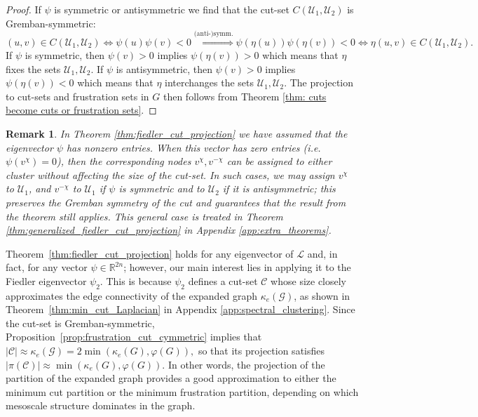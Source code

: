 \documentclass[reprint,onecolumn]{article}
\newtheorem{remark}[theorem]{Remark}
\newcommand{\mc}[1]{\mathcal{#1}}
\newcommand{\R}{\mathbb{R}}
\newcommand{\1}{\mathbb{1}}
\newcommand{\0}{\mathbf{0}}
\begin{document}
\begin{proof}
If $\psi$ is symmetric or antisymmetric we find that the cut-set $C(\mathcal{U}_1,\mathcal{U}_2)$ is Gremban-symmetric:
$$
(u,v)\in C(\mathcal{U}_1,\mathcal{U}_2) \iff \psi(u)\psi(v)<0 \overset{\text{(anti-)symm.}}{\iff} \psi(\eta(u))\psi(\eta(v))<0 \iff \eta(u,v)\in C(\mathcal{U}_1,\mathcal{U}_2).
$$
If $\psi$ is symmetric, then $\psi(v)>0$ implies $\psi(\eta(v))>0$ which means that $\eta$ fixes the sets $\mathcal{U}_1,\mathcal{U}_2$. If $\psi$ is antisymmetric, then $\psi(v)>0$ implies $\psi(\eta(v))<0$ which means that $\eta$ interchanges the sets $\mathcal{U}_1,\mathcal{U}_2$. The projection to cut-sets and frustration sets in $G$ then follows from Theorem \ref{thm: cuts become cuts or frustration sets}.
\end{proof}

\begin{remark}  \label{rem:psi_neq_0_case}
In Theorem \ref{thm:fiedler_cut_projection} we have assumed that the eigenvector $\psi$ has nonzero entries. 
When this vector has zero entries (i.e. $\psi(v^{\chi})=0$), then the corresponding nodes $v^\chi,v^{-\chi}$ can be assigned to either cluster without affecting the size of the cut-set. In such cases, we may assign \( v^\chi \) to $\mathcal{U}_1$, and $v^{-\chi}$ to $\mathcal{U}_1$ if $\psi$ is symmetric and to $\mathcal{U}_2$ if it is antisymmetric; this preserves the Gremban symmetry of the cut and guarantees that the result from the theorem still applies. This general case is treated in Theorem \ref{thm:generalized_fiedler_cut_projection} in Appendix \ref{app:extra_theorems}.
\end{remark}
Theorem~\ref{thm:fiedler_cut_projection} holds for any eigenvector of \( \mc L \) and, in fact, for any vector $\psi\in\R^{2n}$; however, our main interest lies in applying it to the Fiedler eigenvector \( \psi_2 \). This is because \( \psi_2 \) defines a cut-set $\mc C$ whose size closely approximates the edge connectivity of the expanded graph $\kappa_e(\mc G)$, as shown in Theorem~\ref{thm:min_cut_Laplacian} in Appendix \ref{app:spectral_clustering}. Since the cut-set is Gremban-symmetric, Proposition~\ref{prop:frustration_cut_cymmetric} implies that
\(
|\mc C| \approx \kappa_e(\mc G) = 2\min\left( \kappa_e(G), \varphi(G) \right),
\)
so that its projection satisfies
\(
\vert\pi(\mathcal{C})\vert \approx \min\left( \kappa_e(G), \varphi(G) \right).
\)
In other words, the projection of the partition of the expanded graph provides a good approximation to either the minimum cut partition or the minimum frustration partition, depending on which mesoscale structure dominates in the graph.
\end{document}
